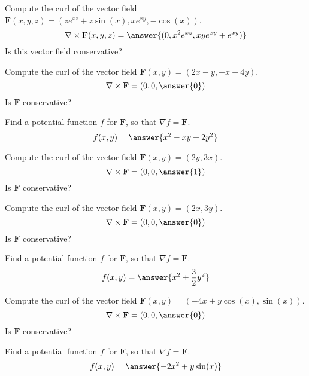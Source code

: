\documentclass{ximera}
\begin{document}
\begin{problem}
Compute the curl of the vector field $\mathbf{F}(x,y,z) = (ze^{xz}+z\sin(x), xe^{xy},-\cos(x))$.
\[
\nabla\times\mathbf{F}(x,y,z) = \answer{(0,x^2e^{xz},xye^{xy}+e^{xy})}
\]
Is this vector field conservative?
\begin{multipleChoice}
\end{multipleChoice}
\end{problem}

\begin{problem}
Compute the curl of the vector field $\mathbf{F}(x,y) = (2x-y, -x+4y)$.
\[
\nabla\times\mathbf{F} = (0,0,\answer{0})
\]
Is $\mathbf{F}$ conservative?
\begin{multipleChoice}
\end{multipleChoice}
\begin{problem}
Find a potential function $f$ for $\mathbf{F}$, so that $\nabla f = \mathbf{F}$.
\[
f(x,y) = \answer{x^2-xy+2y^2}
\]
\end{problem}
\end{problem}

\begin{problem}
Compute the curl of the vector field $\mathbf{F}(x,y) = (2y, 3x)$.
\[
\nabla\times\mathbf{F} = (0,0,\answer{1})
\]
Is $\mathbf{F}$ conservative?
\begin{multipleChoice}
\end{multipleChoice}
\end{problem}

\begin{problem}
Compute the curl of the vector field $\mathbf{F}(x,y) = (2x, 3y)$.
\[
\nabla\times\mathbf{F} = (0,0,\answer{0})
\]
Is $\mathbf{F}$ conservative?
\begin{multipleChoice}
\end{multipleChoice}
\begin{problem}
Find a potential function $f$ for $\mathbf{F}$, so that $\nabla f = \mathbf{F}$.
\[
f(x,y) = \answer{x^2+\frac{3}{2}y^2}
\]
\end{problem}
\end{problem}

\begin{problem}
Compute the curl of the vector field $\mathbf{F}(x,y) = (-4x+y\cos(x), \sin(x))$.
\[
\nabla\times\mathbf{F} = (0,0,\answer{0})
\]
Is $\mathbf{F}$ conservative?
\begin{multipleChoice}
\end{multipleChoice}
\begin{problem}
Find a potential function $f$ for $\mathbf{F}$, so that $\nabla f = \mathbf{F}$.
\[
f(x,y) = \answer{-2x^2+y\sin(x)}
\]
\end{problem}
\end{problem}
\end{document}
